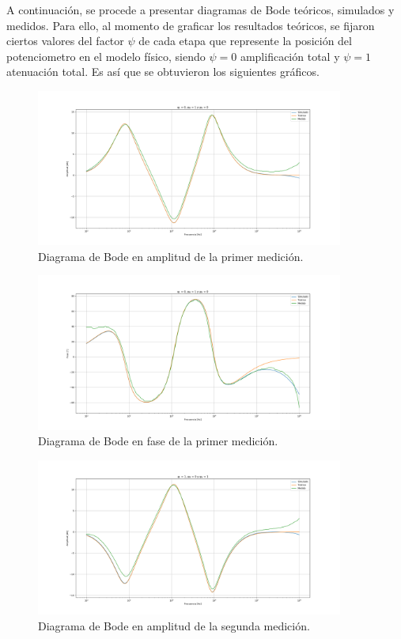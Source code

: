 A continuación, se procede a presentar diagramas de Bode teóricos, simulados y medidos. Para ello, al momento de graficar los resultados teóricos, se fijaron ciertos valores del factor $\psi$ de cada etapa que represente la posición del potenciometro en el modelo físico, siendo $\psi = 0$ amplificación total y $\psi = 1$ atenuación total. Es así que se obtuvieron los siguientes gráficos.
\begin{figure}[H]	
	\centering
	\includegraphics[width=0.9\textwidth]{Imagenes/CBodes-Mod-1.png}
	\caption{Diagrama de Bode en amplitud de la primer medición.}
	\label{fig:CBodes-Mod-1}
\end{figure}
\begin{figure}[H]	
	\centering
	\includegraphics[width=0.9\textwidth]{Imagenes/CBodes-Ph-1.png}
	\caption{Diagrama de Bode en fase de la primer medición.}
	\label{fig:CBodes-Ph-1}
\end{figure}
\begin{figure}[H]	
	\centering
	\includegraphics[width=0.9\textwidth]{Imagenes/CBodes-Mod-2.png}
	\caption{Diagrama de Bode en amplitud de la segunda medición.}
	\label{fig:CBodes-Mod-2}
\end{figure}
